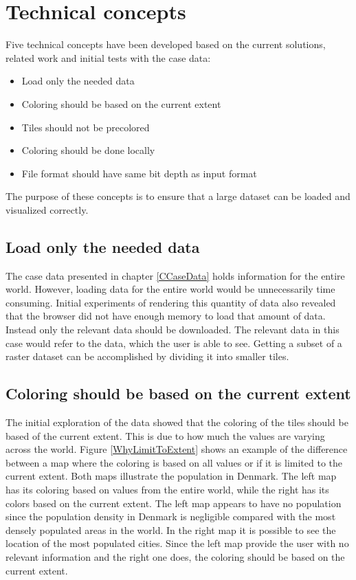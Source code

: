 
\chapter{Technical concepts}\label{CCoreConcepts}
Five technical concepts have been developed based on the current solutions, related work and initial tests with the case data:
\begin{itemize}
	\item Load only the needed data
	\item Coloring should be based on the current extent
	\item Tiles should not be precolored
	\item Coloring should be done locally
	\item File format should have same bit depth as input format
\end{itemize}

The purpose of these concepts is to ensure that a large dataset can be loaded and visualized correctly. 

\section{Load only the needed data}
The case data presented in chapter \ref{CCaseData} holds information for the entire world. However, loading data for the entire world would be unnecessarily time consuming. Initial experiments of rendering this quantity of data also revealed that the browser did not have enough memory to load that amount of data. Instead only the relevant data should be downloaded. The relevant data in this case would refer to the data, which the user is able to see. Getting a subset of a raster dataset can be accomplished by dividing it into smaller tiles. 

\section{Coloring should be based on the current extent}\label{ColorFromCurrentExtent}
The initial exploration of the data showed that the coloring of the tiles should be based of the current extent. This is due to how much the values are varying across the world. Figure \ref{WhyLimitToExtent} shows an example of the difference between a map where the coloring is based on all values or if it is limited to the current extent. Both maps illustrate the population in Denmark. The left map has its coloring based on values from the entire world, while the right has its colors based on the current extent. The left map appears to have no population since the population density in Denmark is negligible compared with the most densely populated areas in the world. In the right map it is possible to see the location of the most populated cities. Since the left map provide the user with no relevant information and the right one does, the coloring should be based on the current extent.


